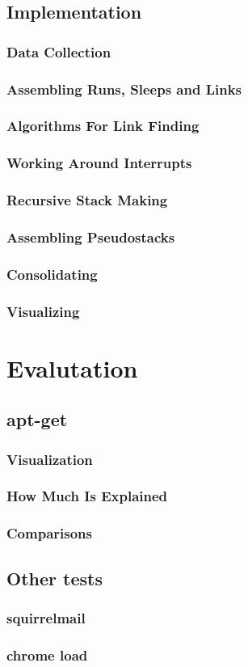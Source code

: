\documentclass[10pt]{article}
\begin{document}
\subsection{Implementation}
\subsubsection{Data Collection}
\subsubsection{Assembling Runs, Sleeps and Links}
\subsubsection{Algorithms For Link Finding}
\subsubsection{Working Around Interrupts}
\subsubsection{Recursive Stack Making}
\subsubsection{Assembling Pseudostacks}
\subsubsection{Consolidating}
\subsubsection{Visualizing}
\section{Evalutation}
\subsection{apt-get}
\subsubsection{Visualization}
\subsubsection{How Much Is Explained}
\subsubsection{Comparisons}
\subsection{Other tests}
\subsubsection{squirrelmail}
\subsubsection{chrome load}
\end{document}

